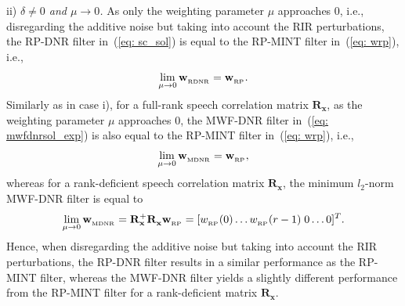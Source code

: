 \documentclass[draftcls,onecolumn,11pt]{IEEEtran}
\begin{document}
ii) {\textit{$\delta \neq 0$ and $\mu \rightarrow 0$.}} \enspace As only the weighting parameter $\mu$ approaches $0$, i.e., disregarding the additive noise but taking into account the RIR perturbations, the RP-DNR filter in~(\ref{eq: sc_sol}) is equal to the RP-MINT filter in~(\ref{eq: wrp}), i.e., 
\begin{equation}
\lim_{ \mu \rightarrow 0 } \mathbf{w}_{_{\rm RDNR}} = \mathbf{w}_{_{\rm RP}}.
\end{equation}
Similarly as in case i), for a full-rank speech correlation matrix $\mathbf{R}_{\mathbf{x}}$, as the weighting parameter $\mu$ approaches $0$, the MWF-DNR filter in~(\ref{eq: mwfdnrsol_exp}) is also equal to the RP-MINT filter in~(\ref{eq: wrp}), i.e., 
\begin{equation}
\lim_{ \mu \rightarrow 0} \mathbf{w}_{_{\rm MDNR}} = \mathbf{w}_{_{\rm RP}},
\end{equation}
whereas for a rank-deficient speech correlation matrix $\mathbf{R}_{\mathbf{x}}$, the minimum $l_2$-norm MWF-DNR filter is equal to
\begin{equation}
\label{eq: convr}
\lim_{ \mu \rightarrow 0} \mathbf{w}_{_{\rm MDNR}} = \mathbf{R}_{\mathbf{x}}^+\mathbf{R}_{\mathbf{x}}^{}\mathbf{w}_{_{\rm RP}} = [w_{_{\rm RP}}(0) \ldots w_{_{\rm RP}}(r-1)  \; 0  \ldots 0]^T. 
\end{equation}
Hence, when disregarding the additive noise but taking into account the RIR perturbations, the RP-DNR filter results in a similar performance as the RP-MINT filter, whereas the MWF-DNR filter yields a slightly different performance from the RP-MINT filter for a rank-deficient matrix $\mathbf{R}_{\mathbf{x}}$.
\end{document}

